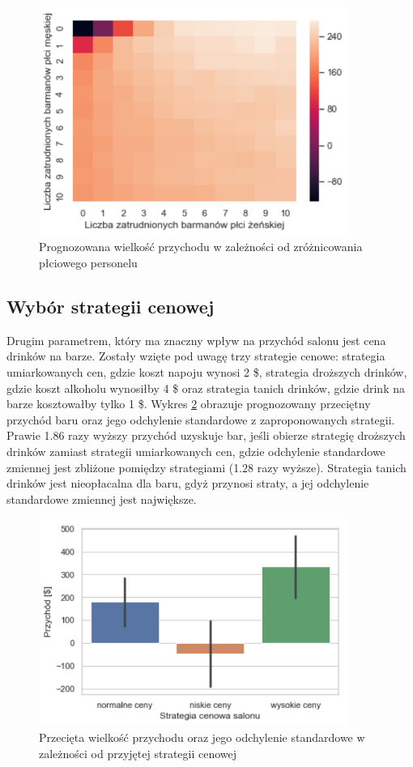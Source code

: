 \documentclass[12pt, a4paper, oneside]{mwart} %
\begin{document}
\begin{figure}
\centering
\caption{Prognozowana wielkość przychodu w zależności od zróżnicowania płciowego personelu}
\label{wyk_barmani}
\includegraphics[width = 0.9\textwidth]{wykresy/barmani.pdf}
\end{figure}

\subsection{Wybór strategii cenowej}
Drugim parametrem, który ma znaczny wpływ na przychód salonu jest cena drinków na barze. Zostały wzięte pod uwagę trzy strategie cenowe: strategia umiarkowanych cen, gdzie koszt napoju wynosi 2 \$, strategia droższych drinków, gdzie koszt alkoholu wynosiłby 4 \$ oraz strategia tanich drinków, gdzie drink na barze kosztowałby tylko 1 \$. Wykres \ref{wyk_drinki} obrazuje prognozowany przeciętny przychód baru oraz jego odchylenie standardowe z zaproponowanych strategii. Prawie 1.86 razy wyższy przychód uzyskuje bar, jeśli obierze strategię droższych drinków zamiast strategii umiarkowanych cen, gdzie odchylenie standardowe zmiennej jest zbliżone pomiędzy strategiami (1.28 razy wyższe). Strategia tanich drinków jest nieopłacalna dla baru, gdyż przynosi straty, a jej odchylenie standardowe zmiennej jest największe.

\begin{figure}
\centering
\caption{Przecięta wielkość przychodu oraz jego odchylenie standardowe w zależności od przyjętej strategii cenowej}
\label{wyk_drinki}
\includegraphics[width = 0.9\textwidth]{wykresy/drinki.pdf}
\end{figure}
\end{document}
